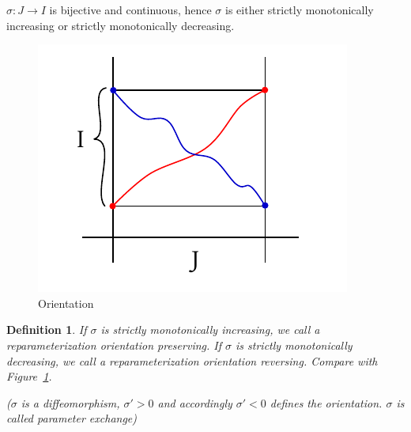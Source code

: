 \documentclass{article}
\newtheorem{definition}{Definition}  \numberwithin{definition}{section}
\begin{document}
$\sigma: J \to I$ is bijective and continuous, hence $\sigma$ is either strictly monotonically increasing or strictly monotonically decreasing.

\begin{figure}[t]
  \begin{center}
    \includegraphics{img/41_orientation_preserving.pdf}
    \caption{Orientation}
    \label{img:orient}
  \end{center}
\end{figure}

\begin{definition}
  If $\sigma$ is strictly monotonically increasing, we call a reparameterization \emph{orientation preserving}.
  If $\sigma$ is strictly monotonically decreasing, we call a reparameterization \emph{orientation reversing}.
  Compare with Figure~\ref{img:orient}.

  ($\sigma$ is a diffeomorphism, $\sigma' > 0$ and accordingly $\sigma' < 0$ defines the orientation. $\sigma$ is called \emph{parameter exchange})
\end{definition}
\end{document}
